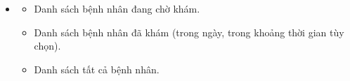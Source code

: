 \begin{itemize}
\begin{itemize}
\begin{itemize}
            \item Ngày sinh
        \end{itemize}
        \item {}
        \begin{itemize}
            \item Danh sách bệnh nhân đang chờ khám.
            \item Danh sách bệnh nhân đã khám (trong ngày, trong khoảng thời gian tùy chọn).
            \item Danh sách tất cả bệnh nhân.
        \end{itemize}
    \end{itemize}
\end{itemize}